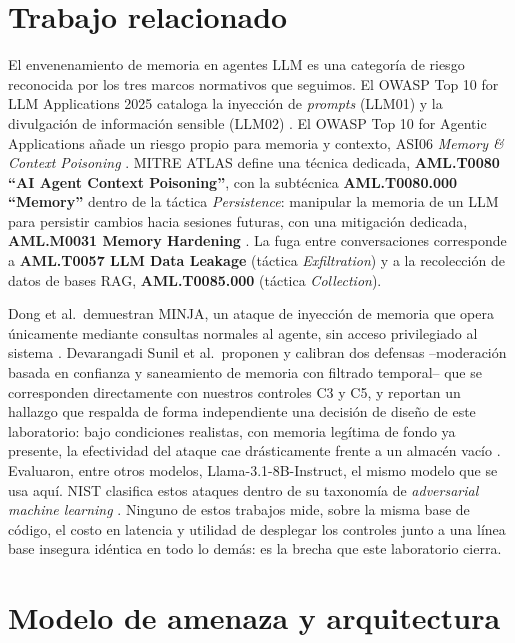 \documentclass[conference]{IEEEtran}
\begin{document}
\section{Trabajo relacionado}

El envenenamiento de memoria en agentes LLM es una categor\'ia de riesgo
reconocida por los tres marcos normativos que seguimos. El OWASP Top 10 for
LLM Applications 2025 cataloga la inyecci\'on de \emph{prompts} (LLM01) y la
divulgaci\'on de informaci\'on sensible (LLM02) \cite{owasp-llm10-2025}. El
OWASP Top 10 for Agentic Applications a\~nade un riesgo propio para memoria y
contexto, ASI06 \emph{Memory \& Context Poisoning} \cite{owasp-agentic-2026}.
MITRE ATLAS define una t\'ecnica dedicada, \textbf{AML.T0080 ``AI Agent Context
Poisoning''}, con la subt\'ecnica \textbf{AML.T0080.000 ``Memory''} dentro de
la t\'actica \emph{Persistence}: manipular la memoria de un LLM para persistir
cambios hacia sesiones futuras, con una mitigaci\'on dedicada,
\textbf{AML.M0031 Memory Hardening} \cite{mitre-atlas}. La fuga entre
conversaciones corresponde a \textbf{AML.T0057 LLM Data Leakage} (t\'actica
\emph{Exfiltration}) y a la recolecci\'on de datos de bases RAG,
\textbf{AML.T0085.000} (t\'actica \emph{Collection}).

Dong et al.\ demuestran MINJA, un ataque de inyecci\'on de memoria que opera
\'unicamente mediante consultas normales al agente, sin acceso privilegiado al
sistema \cite{minja-2025}. Devarangadi Sunil et al.\ proponen y calibran dos
defensas --moderaci\'on basada en confianza y saneamiento de memoria con
filtrado temporal-- que se corresponden directamente con nuestros controles
C3 y C5, y reportan un hallazgo que respalda de forma independiente una
decisi\'on de dise\~no de este laboratorio: bajo condiciones realistas, con
memoria leg\'itima de fondo ya presente, la efectividad del ataque cae
dr\'asticamente frente a un almac\'en vac\'io \cite{memory-poisoning-defense-2026}.
Evaluaron, entre otros modelos, Llama-3.1-8B-Instruct, el mismo modelo que se
usa aqu\'i. NIST clasifica estos ataques dentro de su taxonom\'ia de
\emph{adversarial machine learning} \cite{nist-aml-2025}. Ninguno de estos
trabajos mide, sobre la misma base de c\'odigo, el costo en latencia y
utilidad de desplegar los controles junto a una l\'inea base insegura
id\'entica en todo lo dem\'as: es la brecha que este laboratorio cierra.

\section{Modelo de amenaza y arquitectura}
\end{document}

